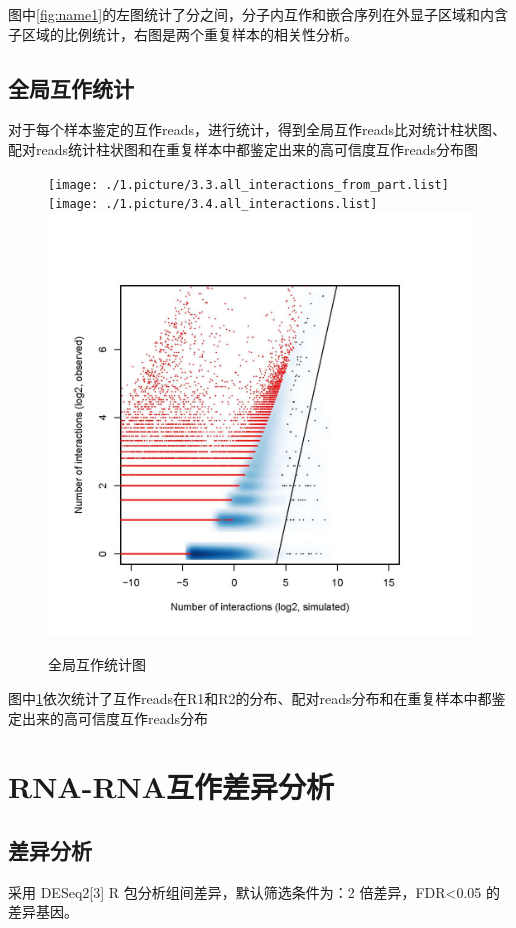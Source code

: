 \documentclass[
]{ctexart}
\begin{document}
图中\ref{fig:name1}的左图统计了分之间，分子内互作和嵌合序列在外显子区域和内含子区域的比例统计，右图是两个重复样本的相关性分析。

\hypertarget{ux5168ux5c40ux4e92ux4f5cux7edfux8ba1}{%
\subsection{全局互作统计}\label{ux5168ux5c40ux4e92ux4f5cux7edfux8ba1}}

对于每个样本鉴定的互作reads，进行统计，得到全局互作reads比对统计柱状图、配对reads统计柱状图和在重复样本中都鉴定出来的高可信度互作reads分布图

\begin{figure}[H]

{\centering \texttt{[image: ./1.picture/3.3.all\_interactions\_from\_part.list]} \texttt{[image: ./1.picture/3.4.all\_interactions.list]} \includegraphics[width=0.33\linewidth]{./1.picture/3.5.highConfidence_interaction} 

}

\caption{全局互作统计图}\label{fig:name2}
\end{figure}

图中\ref{fig:name2}依次统计了互作reads在R1和R2的分布、配对reads分布和在重复样本中都鉴定出来的高可信度互作reads分布

\hypertarget{rna-rnaux4e92ux4f5cux5deeux5f02ux5206ux6790}{%
\section{RNA-RNA互作差异分析}\label{rna-rnaux4e92ux4f5cux5deeux5f02ux5206ux6790}}

\hypertarget{ux5deeux5f02ux5206ux6790}{%
\subsection{差异分析}\label{ux5deeux5f02ux5206ux6790}}

采用 DESeq2{[}3{]} R 包分析组间差异，默认筛选条件为：2 倍差异，FDR\textless0.05
的差异基因。
\end{document}
